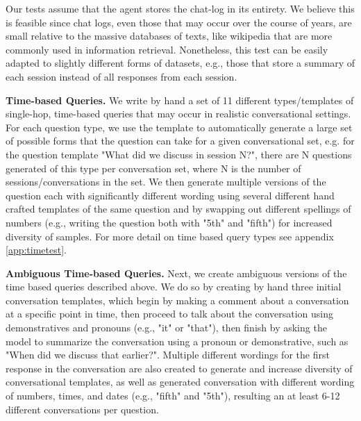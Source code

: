 \documentclass{article}
\begin{document}
Our tests assume that the agent stores the chat-log in its entirety. We believe this is feasible since chat logs, even those that may occur over the course of years, are small relative to the massive databases of texts, like wikipedia that are more commonly used in information retrieval. Nonetheless, this test can be easily adapted to slightly different forms of datasets, e.g., those that store a summary of each session instead of all responses from each session.

\textbf{Time-based Queries.} We write by hand a set of 11 different types/templates of single-hop, time-based queries that may occur in realistic conversational settings. For each question type, we use the template to automatically generate a large set of possible forms that the question can take for a given conversational set, e.g. for the question template "What did we discuss in session N?", there are N questions generated of this type per conversation set, where N is the number of sessions/conversations in the set. We then generate multiple versions of the question each with significantly different wording using several different hand crafted templates of the same question and by swapping out different spellings of numbers (e.g., writing the question both with "5th" and "fifth") for increased diversity of samples. For more detail on time based query types see appendix \ref{app:timetest}.

\textbf{Ambiguous Time-based Queries.} Next, we create ambiguous versions of the time based queries described above. We do so by creating by hand three initial conversation templates, which begin by making a comment about a conversation at a specific point in time, then proceed to talk about the conversation using demonstratives and pronouns (e.g., "it" or "that"), then finish by asking the model to summarize the conversation using a pronoun or demonstrative, such as "When did we discuss that earlier?". Multiple different wordings for the first response in the conversation are also created to generate and increase diversity of conversational templates, as well as generated conversation with different wording of numbers, times, and dates (e.g., "fifth" and "5th"), resulting an at least 6-12 different conversations per question.
\end{document}
